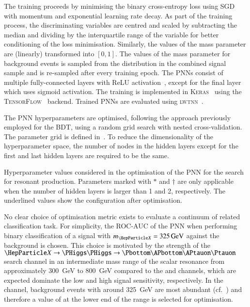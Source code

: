 The training proceeds by minimising the binary cross-entropy loss using
SGD with momentum and exponential learning rate
decay. As part of the training process, the discriminating variables are centred
and scaled by subtracting the median and dividing by the interquartile range of
the variable for better conditioning of the loss minimisation. Similarly, the
values of the mass parameter are (linearly) transformed into $[0, 1]$. The
values of the mass parameter for background events is sampled from the \mX
distribution in the combined signal sample and is re-sampled after every
training epoch. The PNNs consist of multiple fully-connected layers with ReLU
activation~\cite{nair:relu}, except for the final layer which uses sigmoid
activation. The training is implemented in \textsc{Keras}~\cite{keras} using the
\textsc{TensorFlow}~\cite{tensorflow2015-whitepaper} backend. Trained PNNs are
evaluated using \textsc{lwtnn}~\cite{lwtnn}.

The PNN hyperparameters are optimised, following the approach
previously employed for the BDT, using a random grid search with
nested cross-validation. The parameter grid is defined
in~. To reduce the dimensionality of
the hyperparameter space, the number of nodes in the hidden layers
except for the first and last hidden layers are required to be the
same.

\begin{table}[htbp]
  \centering

  \caption[Hyperparameter values considered in the optimsation of the PNN for
  the search for resonant \HH production.]{Hyperparameter values considered in
    the optimisation of the PNN for the search for resonant \HH production.
    Parameters marked with $*$ and $\dagger$ are only applicable when the number
    of hidden layers is larger than 1 and 2, respectively. The underlined values
    show the configuration after optimisation.}%
  \label{tab:hyperparameter_grid_pnn}

  
\end{table}

No clear choice of optimisation metric exists to evaluate a continuum of related
classification task. For simplicity, the ROC-AUC of the PNN when performing
binary classification of a signal with $\mX = \SI{325}{\GeV}$ against the
background is chosen. This choice is motivated by the strength of the
$\PX \to \HH \to \bbtautau$ search channel in an intermediate mass range of the
scalar resonance from approximately \SI{300}{\GeV} to \SI{800}{\GeV} compared to
the \bbyy and \bbbb channels, which are expected dominate the low and high \mX
signal sensitivity, respectively. In the \hadhad channel, background events with
\mHH around \SI{325}{\GeV} are most abundant (cf.~) and
therefore a value of \mX at the lower end of the range is selected for
optimisation.

